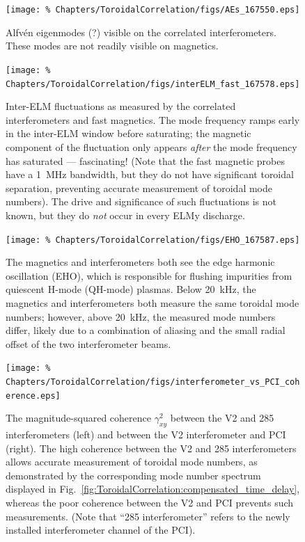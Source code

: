 \begin{figure}[h!]
  \centering
  \texttt{[image: \%
    Chapters/ToroidalCorrelation/figs/AEs\_167550.eps]}
  \caption{Alfv\'{e}n eigenmodes (?) visible
    on the correlated interferometers.
    These modes are not readily visible on magnetics.}
\label{fig:ToroidalCorrelation:AEs}
\end{figure}

\begin{figure}[h!]
  \centering
  \texttt{[image: \%
    Chapters/ToroidalCorrelation/figs/interELM\_fast\_167578.eps]}
  \caption{Inter-ELM fluctuations as measured by
    the correlated interferometers and fast magnetics.
    The mode frequency ramps early in the inter-ELM window before saturating;
    the magnetic component of the fluctuation only appears \emph{after}
    the mode frequency has saturated --- fascinating!
    (Note that the fast magnetic probes have a \SI{1}{\mega\hertz} bandwidth,
    but they do not have significant toroidal separation,
    preventing accurate measurement of toroidal mode numbers).
    The drive and significance of such fluctuations is not known, but
    they do \emph{not} occur in every ELMy discharge.}
\label{fig:ToroidalCorrelation:interELM_fast}
\end{figure}

\begin{figure}[h!]
  \centering
  \texttt{[image: \%
    Chapters/ToroidalCorrelation/figs/EHO\_167587.eps]}
  \caption{The magnetics and interferometers both see the
    edge harmonic oscillation (EHO), which is responsible for
    flushing impurities from quiescent H-mode (QH-mode) plasmas.
    Below \SI{20}{\kilo\hertz}, the magnetics and interferometers
    both measure the same toroidal mode numbers; however,
    above \SI{20}{\kilo\hertz}, the measured mode numbers differ,
    likely due to a combination of aliasing and the small radial offset
    of the two interferometer beams.}
\label{fig:ToroidalCorrelation:EHO}
\end{figure}

\begin{figure}[h!]
  \centering
  \texttt{[image: \%
    Chapters/ToroidalCorrelation/figs/interferometer\_vs\_PCI\_coherence.eps]}
  \caption[%
    Inability to correlate V2 and PCI]{%
      The magnitude-squared coherence $\gamma_{xy}^2$ between
      the V2 and 285 interferometers (left) and
      between the V2 interferometer and PCI (right).
      The high coherence between the V2 and 285 interferometers
      allows accurate measurement of toroidal mode numbers,
      as demonstrated by the corresponding mode number spectrum
      displayed in Fig.~\ref{fig:ToroidalCorrelation:compensated_time_delay},
      whereas the poor coherence between the V2 and PCI
      prevents such measurements.
      (Note that ``285 interferometer'' refers to
      the newly installed interferometer channel of the PCI).}
\label{fig:ToroidalCorrelation:PCI_coherence}
\end{figure}




